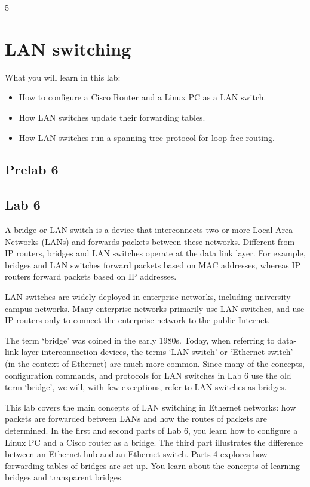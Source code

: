 
\setcounter {chapter} {5}

\chapter{LAN switching}

What you will learn in this lab:
\begin{itemize}
	\item How to configure a Cisco Router and a Linux PC as a LAN switch.
	\item How LAN switches update their forwarding tables.
	\item How LAN switches run a spanning tree protocol for loop free routing.
\end{itemize}

\newpage
{}
\section{Prelab 6}\label{sec:prelab6}


\newpage
{}
\section{Lab 6}\label{sec:lab6}

A bridge or LAN switch is a device that interconnects two or more Local Area Networks (LANs) and forwards packets between these networks. Different from IP routers, bridges and LAN switches operate at the data link layer. For example, bridges and LAN switches forward packets based on MAC addresses, whereas IP routers forward packets based on IP addresses.

LAN switches are widely deployed in enterprise networks, including university campus networks. Many enterprise networks primarily use LAN switches, and use IP routers only to connect the enterprise network to the public Internet.

The term `bridge’ was coined in the early 1980s. Today, when referring to data-link layer interconnection devices, the terms `LAN switch’ or `Ethernet switch’ (in the context of Ethernet) are much more common. Since many of the concepts, configuration commands, and protocols for LAN switches in Lab 6 use the old term `bridge’, we will, with few exceptions, refer to LAN switches as bridges.

This lab covers the main concepts of LAN switching in Ethernet networks: how packets are forwarded between LANs and how the routes of packets are determined. In the first and second parts of Lab 6, you learn how to configure a Linux PC and a Cisco router as a bridge. The third part illustrates the difference between an Ethernet hub and an Ethernet switch. Parts 4 explores how forwarding tables of bridges are set up. You learn about the concepts of learning bridges and transparent bridges.

